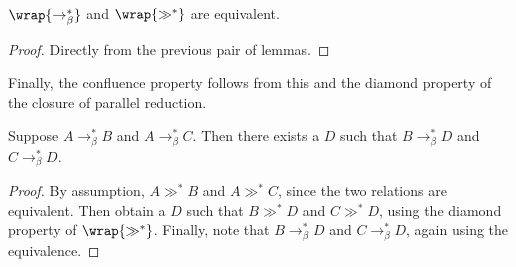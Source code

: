 \begin{lemma}
\(\wrap{\to_\beta^*}\) and \(\wrap{\gg^*}\) are equivalent.
\end{lemma}
\begin{proof}
Directly from the previous pair of lemmas.
\end{proof}

Finally, the confluence property follows from this and the diamond property of the closure of parallel reduction.

\begin{theorem}
Suppose \(A \to_\beta^* B\) and \(A \to_\beta^* C\).
Then there exists a \(D\) such that \(B \to_\beta^* D\) and \(C \to_\beta^* D\).
\end{theorem}
\begin{proof}
By assumption, \(A \gg^* B\) and \(A \gg^* C\), since the two relations are equivalent.
Then obtain a \(D\) such that \(B \gg^* D\) and \(C \gg^* D\), using the diamond property of \(\wrap{\gg^*}\).
Finally, note that \(B \to_\beta^* D\) and \(C \to_\beta^* D\), again using the equivalence.
\end{proof}
